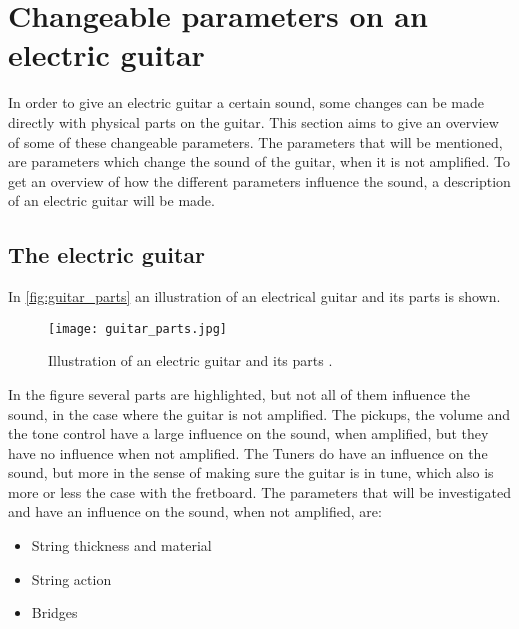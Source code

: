 \section{Changeable parameters on an electric guitar}

In order to give an electric guitar a certain sound, some changes can be made directly with physical parts on the guitar. This section aims to give an overview of some of these changeable parameters. The parameters that will be mentioned, are parameters which change the sound of the guitar, when it is not amplified.
To get an overview of how the different parameters influence the sound, a description of an electric guitar will be made.

\subsection{The electric guitar}

In \autoref{fig:guitar_parts} an illustration of an electrical guitar and its parts is shown.

\begin{figure}[h]
	\centering
		\texttt{[image: guitar\_parts.jpg]}
		\caption{Illustration of an electric guitar and its parts \cite{coustii}.}
		\label{fig:guitar_parts}
\end{figure}

In the figure several parts are highlighted, but not all of them influence the sound, in the case where the guitar is not amplified. The pickups, the volume and the tone control have a large influence on the sound, when amplified, but they have no influence when not amplified. The Tuners do have an influence on the sound, but more in the sense of making sure the guitar is in tune, which also is more or less the case with the fretboard. 
The parameters that will be investigated and have an influence on the sound, when not amplified, are:

\begin{itemize}
 \item String thickness and material
 \item String action
 \item Bridges
\end{itemize}


